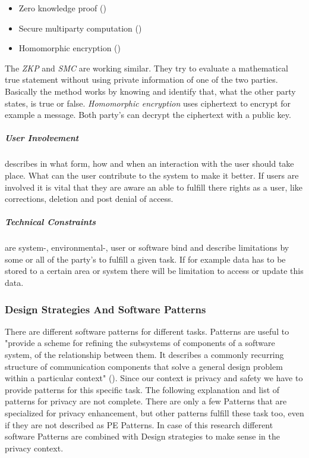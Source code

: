 \begin{itemize}
  \item Zero knowledge proof (\cite{goldreichdefinitions})  
  \item Secure multiparty computation (\cite{lindell2009secure})
  \item Homomorphic encryption (\cite{gentry2009fully})
\end{itemize}

The \textit{ZKP} and \textit{SMC} are working similar. They try to evaluate a mathematical true statement without using private information of one of the two parties. Basically the method works by knowing and identify that, what the other party states, is true or false. \textit{Homomorphic encryption} uses ciphertext to encrypt for example a message. Both party's can decrypt the ciphertext with a public key.

\subparagraph{User Involvement} describes in what form, how and when an interaction with the user should take place. What can the user contribute to the system to make it better. If users are involved it is vital that they are aware an able to fulfill there rights as a user, like corrections, deletion and post denial of access.

\subparagraph{Technical Constraints} are system-, environmental-, user or software bind and describe limitations by some or all of the party's to fulfill a given task. If for example data has to be stored to a certain area or system there will be limitation to access or update this data.

\subsubsection{Design Strategies And Software Patterns}
There are different software patterns for different tasks. Patterns are useful to "provide a scheme for refining the subsystems of components of a software system, of the relationship between them. It describes a commonly recurring structure of communication components that solve a general design problem within a particular context" (\cite{buschmann1996pattern}). Since our context is privacy and safety we have to provide patterns for this specific task. The following explanation and list of patterns for privacy are not complete. There are only a few Patterns that are specialized for privacy enhancement, but other patterns fulfill these task too, even if they are not described as PE Patterns. In case of this research different software Patterns are combined with Design strategies to make sense in the privacy context.

